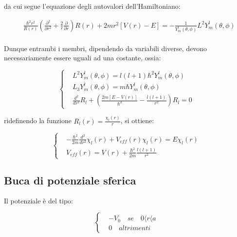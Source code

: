 \documentclass{report}
\begin{document}
da cui segue l'equazione degli autovalori dell'Hamiltoniano:

\begin{equation}
  \begin{aligned}
     & \frac{\hbar^2r^2}{R(r)}\left(\frac{\partial^2}{\partial r^2}+\frac{2}{r}\frac{\partial}{\partial r}  \right)R(r)+2mr^2[V(r)-E] =-\frac{1}{Y^l_m(\theta,\phi)}L^2Y^l_m(\theta,\phi) \\
  \end{aligned}
\end{equation}

Dunque entrambi i membri, dipendendo da variabili diverse, devono necessariamente essere uguali ad una costante,
ossia:

\begin{equation}
  \left\{
  \begin{aligned}
     & L^2Y^l_m(\theta,\phi)=l(l+1)\hbar^2Y^l_m(\theta,\phi)                                 \\
     & L_3Y^l_m(\theta,\phi)=m\hbar Y^l_m(\theta,\phi)                                       \\
     & \frac{d^2}{dr^2}R_l + \left(\frac{2m[E-V(r)]}{\hbar^2}-\frac{l(l+1)}{r^2}\right)R_l=0
  \end{aligned}
  \right.
\end{equation}

ridefinendo la funzione $R_l(r)=\frac{\chi_l(r)}{r}$, si ottiene:

\begin{equation}
  \left\{
  \begin{aligned}
     & -\frac{\hbar^2}{2m}\frac{d^2}{dr^2}\chi_l(r)+V_{eff}(r)\chi_l(r)=E\chi_l(r) \\
     & V_{eff}(r)=V(r)+\frac{\hbar^2}{2m}\frac{l(l+1)}{r^2}
  \end{aligned}
  \right.
\end{equation}

\subsection{Buca di potenziale sferica}
Il potenziale è del tipo:

\begin{equation}
  \left\{
  \begin{aligned}
     & -V_0 \quad se \quad 0\langle r\langle a \\
     & 0 \quad altrimenti
  \end{aligned}
  \right.
\end{equation}
\end{document}
